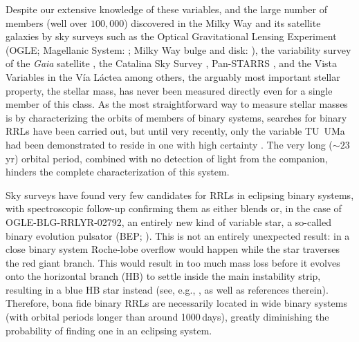 \documentclass[twocolumn,times]{aastex63}
\begin{document}
Despite our extensive knowledge of these variables, and the large number of members
(well over $100{,}000$) discovered in the Milky Way and its satellite galaxies by sky surveys such as
the Optical Gravitational Lensing Experiment
(OGLE; Magellanic System: \citealt{2016AcA....66..131S}; Milky Way bulge and disk: \citealt{2019AcA....69..321S}),
the variability survey of the \textit{Gaia} satellite \citep{2019A&A...622A..60C},
the Catalina Sky Survey \citep{2015MNRAS.446.2251T}, Pan-STARRS \citep{2017AJ....153..204S},
and the Vista Variables in the V\'ia L\'actea \citep{2020ApJ...898...46D} among others,
the arguably most important stellar property, the stellar mass,
has never been measured directly even for a single member of this class.
As the most straightforward way to measure stellar masses is by characterizing
the orbits of members of binary systems, searches for binary RRLs
have been carried out, but until very recently, only the variable TU~UMa had been
demonstrated to reside in one with high certainty
\citep{1999AJ....118.2442W,2016A&A...589A..94L}. The very long ($\sim23$\,yr) orbital period,
combined with no detection of light from the companion, hinders the complete characterization
of this system.

Sky surveys have found very few candidates for RRLs in eclipsing binary systems,
with spectroscopic follow-up confirming them as either blends \citep{2008A&A...489.1209P}
or, in the case of OGLE-BLG-RRLYR-02792, an entirely new kind of variable star, a so-called
binary evolution pulsator (BEP; \citealt{2012Natur.484...75P,2013MNRAS.428.3034S}).
This is not an entirely unexpected result: in a close binary system Roche-lobe
overflow would happen while the star traverses the red giant branch. This would
result in too much mass loss before it evolves onto the horizontal branch (HB)
to settle inside the main instability strip, resulting in a blue HB star instead
(see, e.g., \citealt{2020A&A...641A.163V}, as well as references therein).
Therefore, bona fide binary RRLs are necessarily located in wide binary systems
(with orbital periods longer than around 1000\,days), greatly diminishing the
probability of finding one in an eclipsing system.
\end{document}
